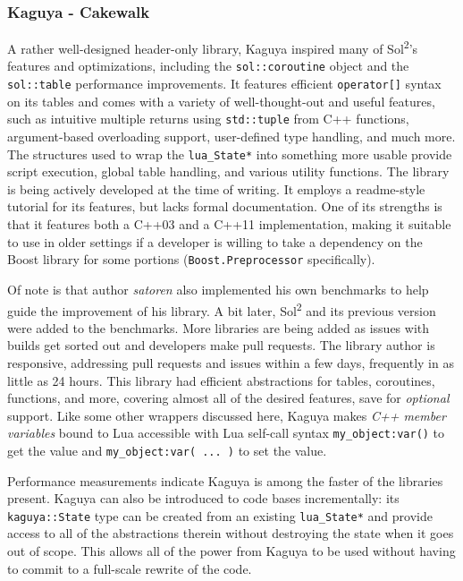 \documentclass[conference,compsoc]{IEEEtran}
\newcommand{\soltwo}{Sol\textsuperscript{2}}
\begin{document}
\subsubsection{Kaguya - Cakewalk}

A rather well-designed header-only library, Kaguya\cite{kaguya} inspired many of \soltwo{}'s features and optimizations, including the \lstinline|sol::coroutine| object and the \lstinline|sol::table| performance improvements. It features efficient \lstinline|operator[]| syntax on its tables and comes with a variety of well-thought-out and useful features, such as intuitive multiple returns using \lstinline|std::tuple| from C++ functions, argument-based overloading support, user-defined type handling, and much more. The structures used to wrap the \lstinline|lua_State*| into something more usable provide script execution, global table handling, and various utility functions. The library is being actively developed at the time of writing. It employs a readme-style tutorial for its features, but lacks formal documentation. One of its strengths is that it features both a C++03 and a C++11 implementation, making it suitable to use in older settings if a developer is willing to take a dependency on the Boost\cite{boost} library for some portions (\lstinline|Boost.Preprocessor| specifically).

Of note is that author \emph{satoren} also implemented his own benchmarks\cite{satoren-bench} to help guide the improvement of his library. A bit later, \soltwo{} and its previous version were added to the benchmarks. More libraries are being added as issues with builds get sorted out and developers make pull requests. The library author is responsive, addressing pull requests and issues within a few days, frequently in as little as 24 hours. This library had efficient abstractions for tables, coroutines, functions, and more, covering almost all of the desired features, save for \emph{optional} support. Like some other wrappers discussed here, Kaguya makes \emph{C++ member variables} bound to Lua accessible with Lua self-call syntax \lstinline|my_object:var()| to get the value and \lstinline|my_object:var( ... )| to set the value.

Performance measurements indicate Kaguya is among the faster of the libraries present. Kaguya can also be introduced to code bases incrementally: its \lstinline|kaguya::State| type can be created from an existing \lstinline|lua_State*| and provide access to all of the abstractions therein without destroying the state when it goes out of scope. This allows all of the power from Kaguya to be used without having to commit to a full-scale rewrite of the code.
\end{document}
